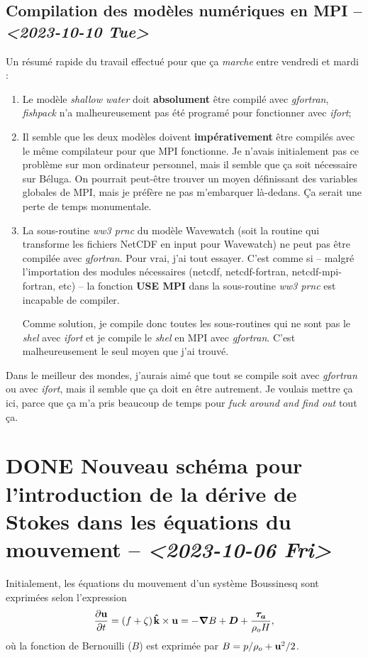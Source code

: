 \documentclass[10pt]{report}
\numberwithin{equation}{section}
\newcommand{\kvf}{\vb{\hat{k}}}
\newcommand{\uu}{\vb{u}}
\newcommand{\pt}{\hspace{1pt}} %
\begin{document}
\subsection{Compilation des modèles numériques en MPI -- \textit{<2023-10-10 Tue>}}
\label{sec:orgb299133}
Un résumé rapide du travail effectué pour que ça \emph{marche} entre vendredi et mardi : \bigskip
\begin{enumerate}
\item Le modèle \emph{shallow water} doit \textbf{absolument} être compilé avec \emph{gfortran}, \emph{fishpack} n'a malheureusement pas été programé pour fonctionner avec \emph{ifort};\bigskip
\item Il semble que les deux modèles doivent \textbf{impérativement} être compilés avec le même compilateur pour que MPI fonctionne.
Je n'avais initialement pas ce problème sur mon ordinateur personnel, mais il semble que ça soit nécessaire sur Béluga.
On pourrait peut-être trouver un moyen définissant des variables globales de MPI, mais je préfère ne pas m'embarquer là-dedans. Ça serait une perte de temps monumentale.\bigskip
\item La sous-routine \emph{ww3 prnc} du modèle Wavewatch (soit la routine qui transforme les fichiers NetCDF en input pour Wavewatch) ne peut pas être compilée avec \emph{gfortran}. Pour vrai, j'ai tout essayer.
C'est comme si -- malgré l'importation des modules nécessaires (netcdf, netcdf-fortran, netcdf-mpi-fortran, etc) -- la fonction \textbf{USE MPI} dans la sous-routine \emph{ww3 prnc} est incapable de compiler.\bigskip

Comme solution, je compile donc toutes les sous-routines qui ne sont pas le \emph{shel} avec \emph{ifort} et je compile le \emph{shel} en MPI avec \emph{gfortran}.
C'est malheureusement le seul moyen que j'ai trouvé.\bigskip
\end{enumerate}

Dans le meilleur des mondes, j'aurais aimé que tout se compile soit avec \emph{gfortran} ou avec \emph{ifort}, mais il semble que ça doit en être autrement.
Je voulais mettre ça ici, parce que ça m'a pris beaucoup de temps pour \emph{fuck around and find out} tout ça.


\section{{\bfseries\sffamily DONE} Nouveau schéma pour l'introduction de la dérive de Stokes dans les équations du mouvement -- \textit{<2023-10-06 Fri>}}
\label{sec:orgab49a9f}
Initialement, les équations du mouvement d'un système Boussinesq sont exprimées selon l'expression
\begin{equation}
\label{eq:orgc5f0991}
   \pdv{\uu}{t} = \qty(f+\zeta)\pt \kvf\times\uu = -\gradient{B} + \boldsymbol{D} + \frac{\boldsymbol{\tau_a}}{\rho_o H},
\end{equation}
où la fonction de Bernouilli (\(B\)) est exprimée par \(B = p/\rho_o + \uu^2/2\).\bigskip
\end{document}
